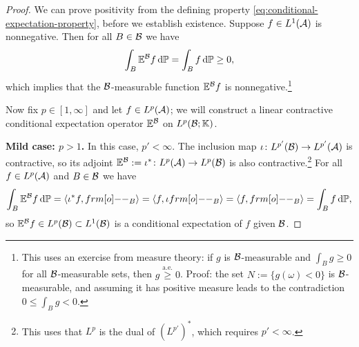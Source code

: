 \begin{proof}
  We can prove positivity from the defining property \eqref{eq:conditional-expectation-property}, before we establish existence.
  Suppose $f \in L^1(\mathcal{A})$ is nonnegative.
  Then for all $B \in \mathcal{B}$ we have
  \begin{equation*}
    \int_B \mathbb{E}^{\mathcal{B}} f \, \mathrm{d}\mathbb{P} = \int_B f \, \mathrm{d}\mathbb{P} \geq 0,
  \end{equation*}
  which implies that the $\mathcal{B}$-measurable function $\mathbb{E}^{\mathcal{B}}f$ is nonnegative.\footnote{This uses an exercise from measure theory: if $g$ is $\mathcal{B}$-measurable and $\int_B g \geq 0$ for all $\mathcal{B}$-measurable sets, then $g \stackrel{\mathrm{a.e.}}{\geq} 0$. Proof: the set $N := \{g(\omega) < 0\}$ is $\mathcal{B}$-measurable, and assuming it has positive measure leads to the contradiction $0 \leq \int_B g < 0$.}
  
  Now fix $p \in [1,\infty]$ and let $f \in L^p(\mathcal{A})$; we will construct a linear contractive conditional expectation operator $\mathbb{E}^{\mathcal{B}}$ on $L^p(\mathcal{B};\mathbb{K})$.

  \textbf{Mild case: $p > 1$.}
  In this case, $p' < \infty$.
  The inclusion map $\iota \colon L^{p'}(\mathcal{B}) \rightarrow L^{p'}(\mathcal{A})$ is contractive, so its adjoint $\mathbb{E}^{\mathcal{B}} := \iota^* \colon L^p(\mathcal{A}) \rightarrow L^p(\mathcal{B})$ is also contractive.\footnote{This uses that $L^p$ is the dual of $(L^{p'})^*$, which requires $p' < \infty$.}
  For all $f \in L^p(\mathcal{A})$ and $B \in \mathcal{B}$ we have
  \begin{equation*}
    \int_B \E^{\mc{B}} f \, \dd\P = \langle \iota^* f, \1_{B} \rangle = \langle f, \iota \1_{B} \rangle = \langle f, \1_{B} \rangle = \int_B f \, \dd\P,
  \end{equation*}
  so $\mathbb{E}^{\mathcal{B}} f \in L^p(\mathcal{B}) \subset L^1(\mathcal{B})$ is a conditional expectation of $f$ given $\mathcal{B}$.



\end{proof}
